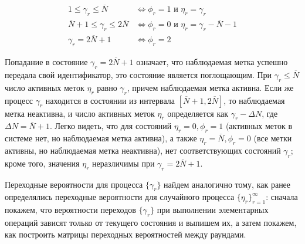 \begin{equation}\label{eq:ch3_gamma_process}
	\begin{aligned}
		1 \leqslant \gamma_r \leqslant \overline{N}                 &\Leftrightarrow \phi_r = 1 \text{ и } \eta_r = \gamma_r \\
		\overline{N} + 1 \leqslant \gamma_r \leqslant 2\overline{N} &\Leftrightarrow \phi_r = 0 \text{ и } \eta_r = \gamma_r - \overline{N} - 1\\
		\gamma_r = 2\overline{N}+1                                  &\Leftrightarrow \phi_r = 2
	\end{aligned}
\end{equation}

Попадание в состояние $\gamma_r = 2\overline{N} + 1$ означает, что наблюдаемая метка успешно передала свой идентификатор, это состояние является поглощающим. При $\gamma_r \leqslant \overline{N}$ число активных меток $\eta_r$ равно $\gamma_r$, причем наблюдаемая метка активна. Если же процесс $\gamma_r$ находится в состоянии из интервала $[\overline{N}+1, 2\overline{N}]$, то наблюдаемая метка неактивна, и число активных меток $\eta_r$ определяется как $\gamma_r - \Delta N$, где $\Delta N = \overline{N} + 1$. Легко видеть, что для состояний $\eta_r = 0, \phi_r = 1$ (активных меток в системе нет, но наблюдаемая метка активна), а также $\eta_r = \overline{N}, \phi_r = 0$ (все метки активны, но наблюдаемая метка неактивна), нет соответствующих состояний $\gamma_r$; кроме того, значения $\eta_r$ неразличимы при $\gamma_r = 2\overline{N} + 1$.

Переходные вероятности для процесса $\{ \gamma_r \}$ найдем аналогично тому, как ранее определялись переходные вероятности для случайного процесса $\{ \eta_r \}_{r=1}^\infty$: сначала покажем, что вероятности переходов $\{ \gamma_r \}$ при выполнении элементарных операций зависят только от текущего состояния и выпишем их, а затем покажем, как построить матрицы переходных вероятностей между раундами.



